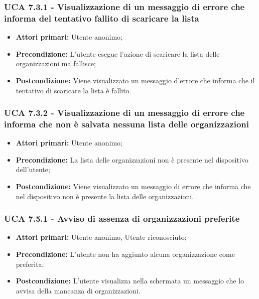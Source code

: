 \subsubsection{UCA 7.3.1 - Visualizzazione di un messaggio di errore che informa del tentativo fallito di scaricare la lista}%
\begin{itemize}
\item \textbf{Attori primari:} Utente anonimo;
\item \textbf{Precondizione:} L'utente esegue l'azione di scaricare la lista delle organizzazioni ma fallisce;
\item \textbf{Postcondizione:} Viene visualizzato un messaggio d'errore che informa che il tentativo di scaricare la lista è fallito.

\end{itemize}

\subsubsection{UCA 7.3.2 - Visualizzazione di un messaggio di errore che informa che non è salvata nessuna lista delle organizzazioni}%
\begin{itemize}
	\item \textbf{Attori primari:} Utente anonimo;
	\item \textbf{Precondizione:} La lista delle organizzazioni non è presente nel dispositivo dell'utente;
	\item \textbf{Postcondizione:} Viene visualizzato un messaggio di errore che informa che nel dispositivo non è presente la lista delle organizzazioni.
\end{itemize}

\subsubsection{UCA 7.5.1 - Avviso di assenza di organizzazioni preferite}
\begin{itemize}
    \item \textbf{Attori primari:} Utente anonimo, Utente riconosciuto;
    \item \textbf{Precondizione:} L'utente non ha aggiunto alcuna organizzazione come preferita;
    \item \textbf{Postcondizione:} L'utente visualizza nella schermata un messaggio che lo avvisa della mancanza di organizzazioni.
\end{itemize}

